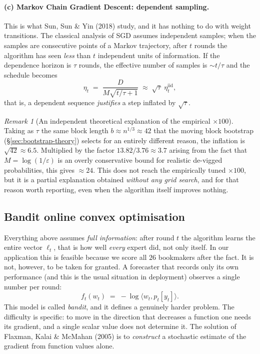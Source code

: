 \documentclass[12pt,a4paper,oneside]{report}
\renewcommand{\_}{\oldunderscore\allowbreak}
\theoremstyle{definition}
\theoremstyle{plain}
\theoremstyle{remark}
\newtheorem{remark}[theorem]{Remark}
\begin{document}
\paragraph{(c) Markov Chain Gradient Descent: dependent sampling.} This is what Sun, Sun \& Yin
(2018) study, and it has nothing to do with weight transitions. The classical analysis of SGD
assumes independent samples; when the samples are consecutive points of a Markov trajectory,
after $t$ rounds the algorithm has seen \emph{less} than $t$ independent units of information. If
the dependence horizon is $\tau$ rounds, the effective number of samples is $\sim t/\tau$ and the
schedule becomes
\[
\eta_t \;=\; \frac{D}{M\sqrt{t/\tau + 1}} \;\approx\; \sqrt{\tau}\;\eta_t^{\text{iid}},
\]
that is, a dependent sequence \emph{justifies} a step inflated by $\sqrt{\tau}$.

\begin{remark}[An independent theoretical explanation of the empirical $\times100$]
Taking as $\tau$ the same block length $b \approx n^{1/3} \approx 42$ that the moving block
bootstrap (\S\ref{sec:bootstrap-theory}) selects for an entirely different reason, the inflation
is $\sqrt{42}\approx 6.5$. Multiplied by the factor $13.82/3.76 \approx 3.7$ arising from the
fact that $M=\log(1/\varepsilon)$ is an overly conservative bound for realistic de-vigged
probabilities, this gives $\approx 24$. This does not reach the empirically tuned $\times100$,
but it is a partial explanation obtained \emph{without any grid search}, and for that reason
worth reporting, even when the algorithm itself improves nothing.
\end{remark}

\subsection{Bandit online convex optimisation}
\label{sec:bandit-theory}

Everything above assumes \emph{full information}: after round $t$ the algorithm learns the entire
vector $\ell_t$, that is how well \emph{every} expert did, not only itself. In our application
this is feasible because we score all $26$ bookmakers after the fact. It is not, however, to be
taken for granted. A forecaster that records only its own performance (and this is the usual
situation in deployment) observes a single number per round: \[ f_t(w_t) \;=\; -\log\langle
w_t, p_t[y_t]\rangle . \] This model is called \emph{bandit}, and it defines a genuinely harder
problem. The difficulty is specific: to move in the direction that decreases a function one
needs its gradient, and a single scalar value does not determine it. The solution of Flaxman,
Kalai \& McMahan (2005) is to \emph{construct} a stochastic estimate of the gradient from
function values alone.
\end{document}
